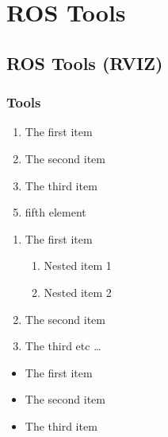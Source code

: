
\chapter{ROS Tools}

\section{ROS Tools (RVIZ)}

\subsection{Tools}


\begin{enumerate}
\item The first item
\item The second item
\item The third item
\end{enumerate}

\begin{enumerate}
  \setcounter{enumi}{4}
  \item fifth element
\end{enumerate}

\begin{enumerate}
  \item The first item
  \begin{enumerate}
    \item Nested item 1
    \item Nested item 2
  \end{enumerate}
  \item The second item
  \item The third etc \ldots
\end{enumerate}


\begin{itemize}[leftmargin=*]
\item The first item
\item The second item
\item The third item
\end{itemize}


